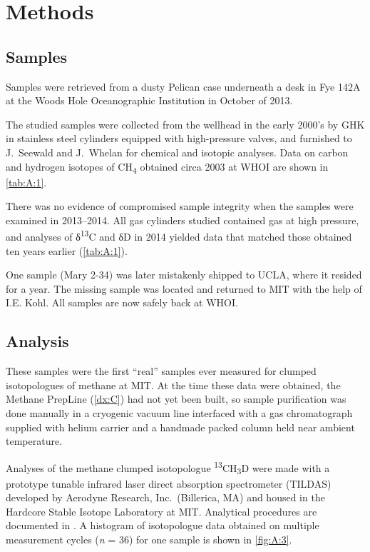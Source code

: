 \section{Methods}\label{methods-2}

\subsection{Samples}\label{samples}

Samples were retrieved from a dusty Pelican case underneath a desk in
Fye 142A at the Woods Hole Oceanographic Institution in October of 2013.

The studied samples were collected from the wellhead in the early 2000's
by GHK in stainless steel cylinders equipped with high-pressure valves,
and furnished to J.\ Seewald and J.\ Whelan for chemical and isotopic
analyses. Data on carbon and hydrogen isotopes of CH\textsubscript{4}
obtained circa 2003 at WHOI \parencite{Seewald+Whelan_2005_AAPG-Origin-of-Petroleum} are shown in
\autoref{tab:A:1}.

There was no evidence of compromised sample integrity when the samples
were examined in 2013--2014. All gas cylinders studied contained gas at
high pressure, and analyses of δ\textsuperscript{13}C and δD in 2014
yielded data that matched those obtained ten years earlier (\autoref{tab:A:1}).

One sample (Mary 2-34) was later mistakenly shipped to UCLA, where it resided for a year.  The missing sample was located and returned to MIT with the help of I.E. Kohl.  All samples are now safely back at WHOI.

\subsection{Analysis}\label{analysis}



These samples were the first ``real'' samples ever measured for clumped
isotopologues of methane at MIT. At the time these data were obtained,
the Methane PrepLine (\autoref{dx:C}) had not yet been built, so sample
purification was done manually in a cryogenic vacuum line interfaced
with a gas chromatograph supplied with helium carrier and a handmade
packed column held near ambient temperature.

Analyses of the methane clumped isotopologue
\textsuperscript{13}CH\textsubscript{3}D were made with a prototype
tunable infrared laser direct absorption spectrometer (TILDAS) developed
by Aerodyne Research, Inc.\ (Billerica, MA) and housed in the Hardcore
Stable Isotope Laboratory at MIT. Analytical procedures are documented
in \textcite{Ono++_2014_AC}. A histogram of isotopologue data obtained on
multiple measurement cycles (\emph{n} = 36) for one sample is shown in
\autoref{fig:A:3}.


